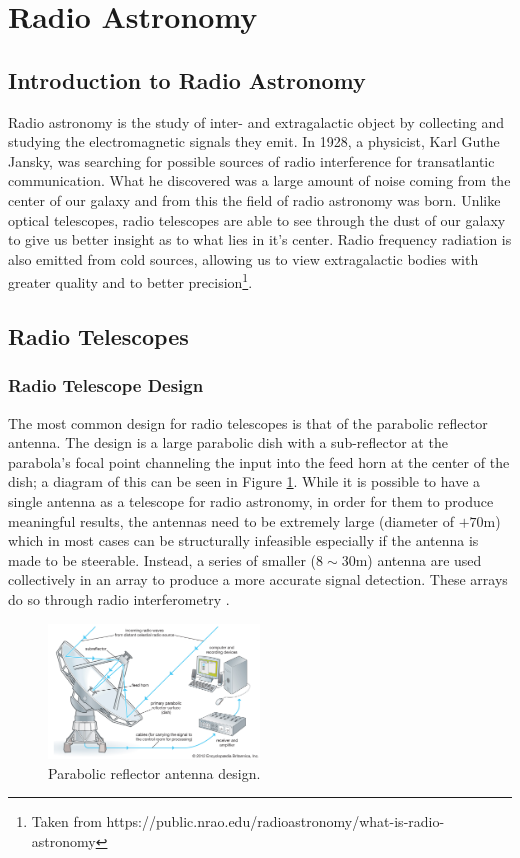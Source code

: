 \section{Radio Astronomy}\label{ra}
\subsection{Introduction to Radio Astronomy}
Radio astronomy is the study of inter- and extragalactic object by collecting and studying the electromagnetic signals they emit. In 1928, a physicist, Karl Guthe Jansky, was searching for possible sources of radio interference for transatlantic communication. What he discovered was a large amount of noise coming from the center of our galaxy and from this the field of radio astronomy was born. Unlike optical telescopes, radio telescopes are able to see through the dust of our galaxy to give us better insight as to what lies in it's center. Radio frequency radiation is also emitted from cold sources, allowing us to view extragalactic bodies with greater quality and to better precision\footnote{Taken from https://public.nrao.edu/radioastronomy/what-is-radio-astronomy}.
\subsection{Radio Telescopes}\label{ra:sec:rt}
%
\subsubsection{Radio Telescope Design}
The most common design for radio telescopes is that of the parabolic reflector antenna. The design is a large parabolic dish with a sub-reflector at the parabola's focal point channeling the input into the feed horn at the center of the dish; a diagram of this can be seen in Figure \ref{ra:fig:para}. While it is possible to have a single antenna as a telescope for radio astronomy, in order for them to produce meaningful results, the antennas need to be extremely large (diameter of $+70$m) which in most cases can be structurally infeasible especially if the antenna is made to be steerable. Instead, a series of smaller ($8\sim30$m) antenna are used collectively in an array to produce a more accurate signal detection. These arrays do so through radio interferometry \citep{cheng2009radio}.
%
\begin{figure}[H]
	\centering
	\includegraphics[width=0.5\textwidth]{Images/Telescope.jpg}
	\caption[]{Parabolic reflector antenna design\footnotemark.}
	\label{ra:fig:para}
\end{figure}
%
